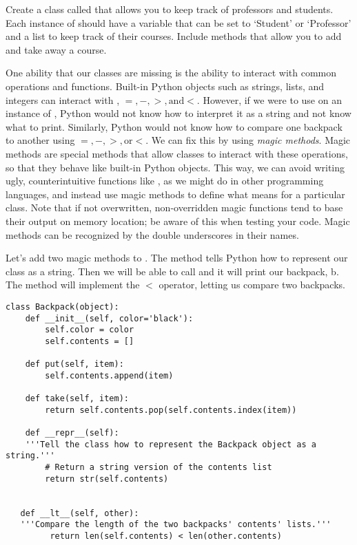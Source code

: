 \begin{problem}
Create a class called  that allows you to keep track of professors and students.
Each instance of  should have a variable that can be set to `Student' or `Professor' and a list to keep track of their courses.
Include methods that allow you to add and take away a course.
\label{School}
\end{problem}

One ability that our classes are missing is the ability to interact with common operations and functions.
Built-in Python objects such as strings, lists, and integers can interact with ,  $ =, - , >, \text{and} <$.
However, if we were to use  on an instance of , Python would not know how to interpret it as a string and not know what to print.
Similarly, Python would not know how to compare one backpack to another using $ =, - , >, \text{or} <$.
We can fix this by using \emph{magic methods}.
Magic methods are special methods that allow classes to interact with these operations, so that they behave like built-in Python objects. This way, we can avoid writing ugly, counterintuitive functions like , as we might do in other programming languages, and instead use magic methods to define what  means for a particular class. Note that if not overwritten, non-overridden magic functions tend to base their output on memory location; be aware of this when testing your code.
Magic methods can be recognized by the double underscores in their names.

Let's add two magic methods to .
The  method tells Python how to represent our class as a string.
Then we will be able to call  and it will print our backpack, b.
The  method will implement the $<$ operator, letting us compare two backpacks.

\begin{lstlisting}
class Backpack(object):
    def __init__(self, color='black'):
    	self.color = color
    	self.contents = []

    def put(self, item):
    	self.contents.append(item)

    def take(self, item):
    	return self.contents.pop(self.contents.index(item))

    def __repr__(self):
    '''Tell the class how to represent the Backpack object as a string.'''
    	# Return a string version of the contents list
        return str(self.contents)


   def __lt__(self, other):
   '''Compare the length of the two backpacks' contents' lists.'''
     	 return len(self.contents) < len(other.contents)

\end{lstlisting}

